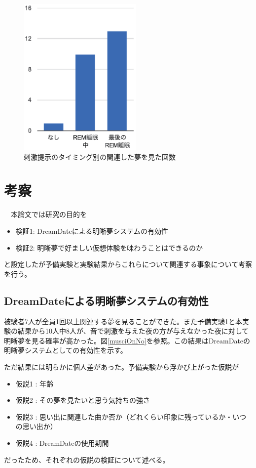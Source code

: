 \begin{figure}[htbp]
\begin{center}
\includegraphics[width=6cm]{eps/result.eps}
\caption{刺激提示のタイミング別の関連した夢を見た回数}
\label{result}
\end{center}
\end{figure}

\section{考察}  
　本論文では研究の目的を
\begin{itemize}
\item 検証1: DreamDateによる明晰夢システムの有効性
\item 検証2: 明晰夢で好ましい仮想体験を味わうことはできるのか
\end{itemize}
と設定したが予備実験と実験結果からこれらについて関連する事象について考察を行う。

\subsection{DreamDateによる明晰夢システムの有効性} 
被験者7人が全員1回以上関連する夢を見ることができた。また予備実験1と本実験の結果から10人中8人が、音で刺激を与えた夜の方が与えなかった夜に対して明晰夢を見る確率が高かった。図\ref{musciOnNo}を参照。この結果はDreamDateの明晰夢システムとしての有効性を示す。

ただ結果には明らかに個人差があった。予備実験から浮かび上がった仮説が
\begin{itemize}
\item 仮説1 : 年齢
\item 仮説2 : その夢を見たいと思う気持ちの強さ
\item 仮説3 : 思い出に関連した曲か否か（どれくらい印象に残っているか・いつの思い出か）
\item 仮説4 : DreamDateの使用期間
\end{itemize}
だったため、それぞれの仮説の検証について述べる。

